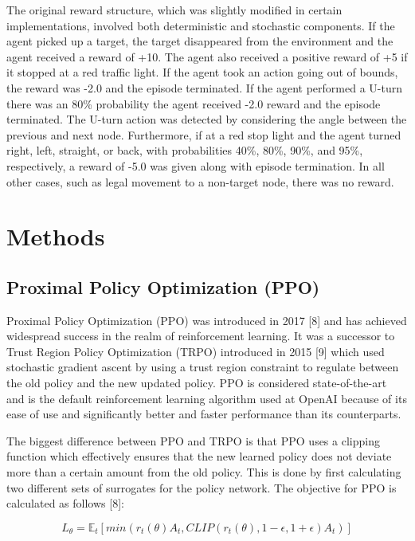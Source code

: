 \documentclass{article}
\begin{document}
	The original reward structure, which was slightly modified in certain implementations, involved both deterministic and stochastic components. If the agent picked up a target, the target disappeared from the environment and the agent received a reward of +10. The agent also received a positive reward of +5 if it stopped at a red traffic light. If the agent took an action going out of bounds, the reward was -2.0 and the episode terminated. If the agent performed a U-turn there was an 80\% probability the agent received -2.0 reward and the episode terminated. The U-turn action was detected by considering the angle between the previous and next node. Furthermore, if at a red stop light and the agent turned right, left, straight, or back, with probabilities 40\%, 80\%, 90\%, and 95\%, respectively, a reward of -5.0 was given along with episode termination. In all other cases, such as legal movement to a non-target node, there was no reward.
	
	\section{Methods}
	\subsection{Proximal Policy Optimization (PPO)}
	\label{ppo}
	
	Proximal Policy Optimization (PPO) was introduced in 2017 [8] and has achieved widespread success in the realm of reinforcement learning. It was a successor to Trust Region Policy Optimization (TRPO) introduced in 2015 [9] which used stochastic gradient ascent by using a trust region constraint to regulate between the old policy and the new updated policy. PPO is considered state-of-the-art and is the default reinforcement learning algorithm used at OpenAI because of its ease of use and significantly better and faster performance than its counterparts. 
	
	The biggest difference between PPO and TRPO is that PPO uses a clipping function which effectively ensures that the new learned policy does not deviate more than a certain amount from the old policy. This is done by first calculating two different sets of surrogates for the policy network. The objective for PPO is calculated as follows [8]:
	
	\begin{equation}
		L_{\theta} = \mathbb{E}_{t}[min(r_{t}({\theta})A_{t}, CLIP(r_{t}({\theta}), 1-\epsilon, 1+\epsilon)A_{t})]
	\end{equation}
	
\end{document}

